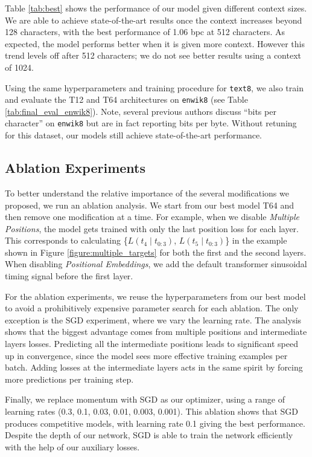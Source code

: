 Table \ref{tab:best} shows the performance of our model given different context sizes. We are able to achieve state-of-the-art results once the context increases beyond 128 characters, with the best performance of 1.06 bpc at 512 characters. As expected, the model performs better when it is given more context. However this trend levels off after 512 characters; we do not see better results using a context of 1024.

Using the same hyperparameters and training procedure for \texttt{text8}, we also train and evaluate the \textsc{T12} and \textsc{T64} architectures on \texttt{enwik8} (see Table \ref{tab:final_eval_enwik8}).
Note, several previous authors discuss ``bits per character'' on \texttt{enwik8} but are in fact reporting bits per byte. Without retuning for this dataset, our models still achieve state-of-the-art performance.

\subsection{Ablation Experiments}
\label{section:ablation}

To better understand the relative importance of the several modifications we proposed, we run an ablation analysis. We start from our best model \textsc{T64} and then remove one modification at a time. For example, when we disable \emph{Multiple Positions}, the model gets trained with only the last position loss for each layer. This corresponds to calculating \{$L(t_4\mid t_{0:3})$, $L(t_5\mid t_{0:3})$\} in the example shown in Figure \ref{figure:multiple_targets} for both the first and the second layers. When disabling \emph{Positional Embeddings}, we add the default transformer sinusoidal timing signal before the first layer.

For the ablation experiments, we reuse the hyperparameters from our best model to avoid a prohibitively expensive parameter search for each ablation. The only exception is the SGD experiment, where we vary the learning rate. The analysis shows that the biggest advantage comes from multiple positions and intermediate layers losses. Predicting all the intermediate positions leads to significant speed up in convergence, since the model sees more effective training examples per batch. Adding losses at the intermediate layers acts in the same spirit by forcing more predictions per training step.

Finally, we replace momentum with SGD as our optimizer, using a range of learning rates (0.3, 0.1, 0.03, 0.01, 0.003, 0.001). This ablation shows that SGD produces competitive models, with learning rate 0.1 giving the best performance. Despite the depth of our network, SGD is able to train the network efficiently with the help of our auxiliary losses.

